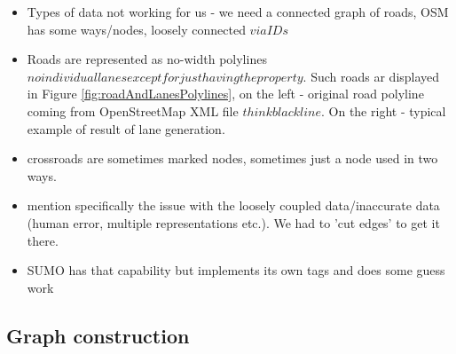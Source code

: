 \begin{itemize}
\begin{itemize}
        \item Types of data not working for us - we need  a connected graph of roads, OSM has some ways/nodes, loosely  connected \(via IDs\)
        \item Roads are represented as no-width polylines \(no individual lanes except for just having the property\). Such roads ar displayed in Figure \ref{fig:roadAndLanesPolylines}, on the left - original road polyline coming from OpenStreetMap XML file \(think black line\). On the right - typical example of result of lane generation.
        \item crossroads are sometimes marked nodes, sometimes just a node used in two ways.
        \item mention specifically the issue with the loosely coupled data/inaccurate data (human error, multiple representations etc.). We had to 'cut edges' to get it there.
        \item SUMO has that capability but implements its own tags and does some guess work
    \end{itemize}
\end{itemize}

\subsection{Graph construction}


